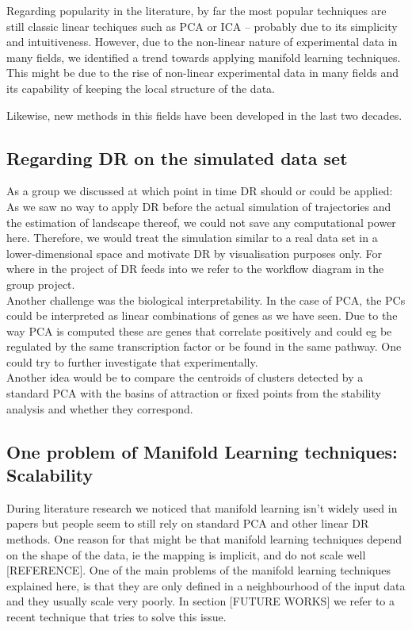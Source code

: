 \documentclass[journal, a4paper]{IEEEtran}
\begin{document}
Regarding popularity in the literature, %
by far the most popular techniques are still classic linear techiques such as PCA or ICA -- probably due to its simplicity and intuitiveness. However, due to the non-linear nature of experimental data in many fields, we identified a trend towards applying manifold learning techniques. This might be due to the rise of non-linear experimental data in many fields and its capability of keeping the local structure of the data.

Likewise, new methods in this fields have been developed in the last two decades.



\subsection{Regarding DR on the simulated data set}

As a group we discussed at which point in time DR should or could be applied: As we saw no way to apply DR before the actual simulation of trajectories and the estimation of landscape thereof, we could not save any computational power here. Therefore, we would treat the simulation similar to a real data set in a lower-dimensional space and motivate DR by visualisation purposes only. For where in the project of DR feeds into we refer to the workflow diagram in the group project.\\

Another challenge was the biological interpretability. In the case of PCA, the PCs could be interpreted as linear combinations of genes as we have seen. Due to the way PCA is computed these are genes that correlate positively and could eg be regulated by the same transcription factor or be found in the same pathway. 
One could try to further investigate that experimentally. \\
Another idea would be to compare the centroids of clusters detected by a standard PCA with the basins of attraction or fixed points from the stability analysis and whether they correspond.

\subsection{One problem of Manifold Learning techniques: Scalability}
During literature research we noticed that manifold learning isn’t widely used in papers but people seem to still rely on standard PCA and other linear DR methods. 
One reason for that might be that manifold learning techniques depend on the shape of the data, ie the mapping is implicit, and do not scale well [REFERENCE]. 
One of the main problems of the manifold learning techniques explained here, is that they are only defined in a neighbourhood of the input data and they usually scale very poorly. In section [FUTURE WORKS] we refer to a recent technique that tries to solve this issue.
\end{document}
